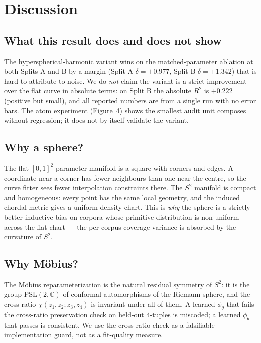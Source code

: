 \documentclass[11pt,a4paper]{article}
\begin{document}
\section{Discussion}

\subsection{What this result does and does not show}
The hyperspherical-harmonic variant wins on the matched-parameter ablation at both Splits A and B by a margin (Split A $\delta = +0.977$, Split B $\delta = +1.342$) that is hard to attribute to noise. We do \emph{not} claim the variant is a strict improvement over the flat curve in absolute terms: on Split B the absolute $R^2$ is $+0.222$ (positive but small), and all reported numbers are from a single run with no error bars. The atom experiment (Figure~4) shows the smallest audit unit composes without regression; it does not by itself validate the variant.

\subsection{Why a sphere?}
The flat $[0,1]^2$ parameter manifold is a square with corners and edges. A coordinate near a corner has fewer neighbours than one near the centre, so the curve fitter sees fewer interpolation constraints there. The $S^2$ manifold is compact and homogeneous: every point has the same local geometry, and the induced chordal metric gives a uniform-density chart. This is \emph{why} the sphere is a strictly better inductive bias on corpora whose primitive distribution is non-uniform across the flat chart --- the per-corpus coverage variance is absorbed by the curvature of $S^2$.

\subsection{Why M\"obius?}
The M\"obius reparameterization is the natural residual symmetry of $S^2$: it is the group $\mathrm{PSL}(2,\mathbb{C})$ of conformal automorphisms of the Riemann sphere, and the cross-ratio $\chi(z_1, z_2; z_3, z_4)$ is invariant under all of them. A learned $\phi_\theta$ that fails the cross-ratio preservation check on held-out $4$-tuples is miscoded; a learned $\phi_\theta$ that passes is consistent. We use the cross-ratio check as a falsifiable implementation guard, not as a fit-quality measure.
\end{document}
